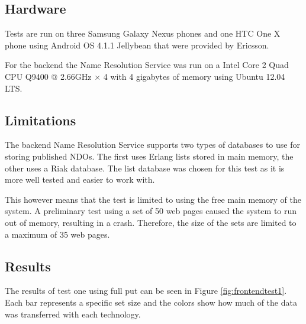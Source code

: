 \subsection{Hardware}

Tests are run on three Samsung Galaxy Nexus phones and one HTC One X phone using Android OS 4.1.1 Jellybean that were provided by Ericsson.

For the backend the Name Resolution Service was run on a Intel Core 2 Quad CPU Q9400 @ 2.66GHz × 4 with 4 gigabytes of memory using Ubuntu 12.04 LTS.

\subsection{Limitations}

The backend Name Resolution Service supports two types of databases to use for storing published NDOs. The first uses Erlang lists stored in main memory, the other uses a Riak database. The list database was chosen for this test as it is more well tested and easier to work with.

This however means that the test is limited to using the free main memory of the system. A preliminary test using a set of 50 web pages caused the system to run out of memory, resulting in a crash. Therefore, the size of the sets are limited to a maximum of 35 web pages.

\subsection{Results}




The results of test one using full put can be seen in Figure \ref{fig:frontendtest1}. Each bar represents a specific set size and the colors show how much of the data was transferred with each technology.

